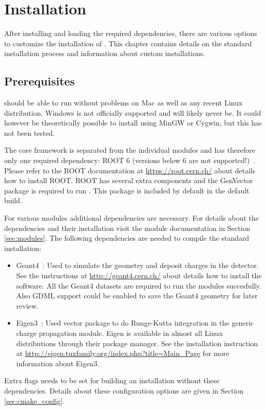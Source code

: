 \section{Installation}
\label{sec:installation}
After installing and loading the required dependencies, there are various options to customize the installation of \apsq. This chapter contains details on the standard installation process and information about custom installations.

\subsection{Prerequisites}
\label{sec:prerequisites}
\apsq should be able to run without problems on Mac as well as any recent Linux distribution. Windows is not officially supported and will likely never be. It could however be theoretically possible to install \apsq using MinGW or Cygwin, but this has not been tested.

The core framework is separated from the individual modules and \apsq has therefore only one required dependency: ROOT 6 (versions below 6 are not supported!)~\cite{root}. Please refer to the ROOT documentation at \url{https://root.cern.ch/} about details how to install ROOT. ROOT has several extra components and the GenVector package is required to run \apsq. This package is included by default in the default build.

For various modules additional dependencies are necessary. For details about the dependencies and their installation visit the module documentation in Section \ref{sec:modules}. The following dependencies are needed to compile the standard installation:
\begin{itemize}
\item Geant4~\cite{geant4}: Used to simulate the geometry and deposit charges in the detector. See the instructions at \url{http://geant4.cern.ch/} about details how to install the software. All the Geant4 datasets are required to run the modules succesfully. Also GDML support could be enabled to save the Geant4 geometry for later review.
\item Eigen3~\cite{eigen3}: Used vector package to do Runge-Kutta integration in the generic charge propagation module. Eigen is available in almost all Linux distributions through their package manager. See the installation instruction at \url{http://eigen.tuxfamily.org/index.php?title=Main_Page} for more information about Eigen3.
\end{itemize}
Extra flags needs to be set for building an \apsq installation without these dependencies. Details about these configuration options are given in Section \ref{sec:cmake_config}.

